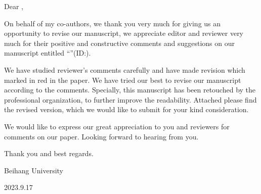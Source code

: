 \noindent Dear \editorname,

On behalf of my co-authors, we thank you very much for giving us an opportunity to revise our manuscript, we appreciate editor and reviewer very much for their positive and constructive comments and suggestions on our manuscript entitled \enquote{\thetitle}(ID:\manuscript).

We have studied reviewer's comments carefully and have made revision which marked in red in the paper. We have tried our best to revise our manuscript according to the comments. Specially, this manuscript has been retouched by the professional organization, to further improve the readability. Attached please find the revised version, which we would like to submit for your kind consideration.

We would like to express our great appreciation to you and reviewers for comments on our paper. Looking forward to hearing from you.

Thank you and best regards.

\begin{flushright}
\theauthor

Beihang University

2023.9.17
\end{flushright}